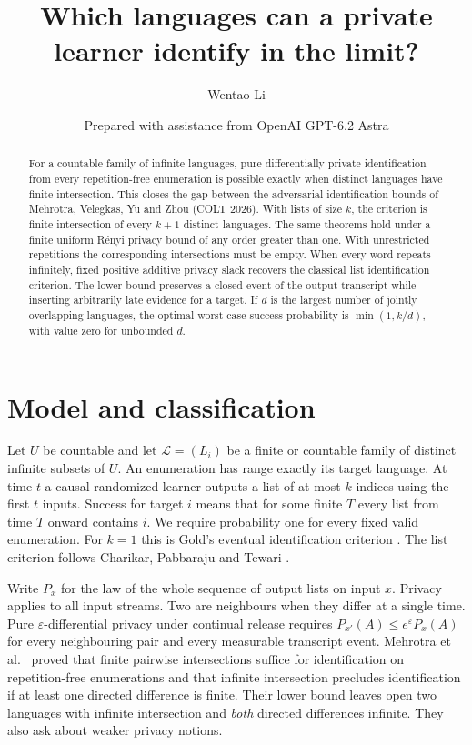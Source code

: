 \documentclass[11pt]{article}
\title{Which languages can a private learner identify in the limit?}
\author{Wentao Li}
\date{\small Prepared with assistance from OpenAI GPT-6.2 Astra}
\begin{document}
\maketitle
\begin{abstract}
For a countable family of infinite languages, pure differentially private identification from every repetition-free enumeration is possible exactly when distinct languages have finite intersection. This closes the gap between the adversarial identification bounds of Mehrotra, Velegkas, Yu and Zhou (COLT 2026). With lists of size $k$, the criterion is finite intersection of every $k+1$ distinct languages. The same theorems hold under a finite uniform R\'enyi privacy bound of any order greater than one. With unrestricted repetitions the corresponding intersections must be empty. When every word repeats infinitely, fixed positive additive privacy slack recovers the classical list identification criterion. The lower bound preserves a closed event of the output transcript while inserting arbitrarily late evidence for a target. If $d$ is the largest number of jointly overlapping languages, the optimal worst-case success probability is $\min(1,k/d)$, with value zero for unbounded $d$.
\end{abstract}

\section{Model and classification}
Let $U$ be countable and let $\mathcal L=(L_i)$ be a finite or countable family of distinct infinite subsets of $U$. An enumeration has range exactly its target language. At time $t$ a causal randomized learner outputs a list of at most $k$ indices using the first $t$ inputs. Success for target $i$ means that for some finite $T$ every list from time $T$ onward contains $i$. We require probability one for every fixed valid enumeration. For $k=1$ this is Gold's eventual identification criterion \cite{gold}. The list criterion follows Charikar, Pabbaraju and Tewari \cite[Def.~5]{cpt}.

Write $P_x$ for the law of the whole sequence of output lists on input $x$. Privacy applies to all input streams. Two are neighbours when they differ at a single time. Pure $\varepsilon$-differential privacy under continual release requires $P_{x'}(A)\le e^\varepsilon P_x(A)$ for every neighbouring pair and every measurable transcript event. Mehrotra et al.\ \cite[Thms.~1.5, C.5]{mv} proved that finite pairwise intersections suffice for identification on repetition-free enumerations and that infinite intersection precludes identification if at least one directed difference is finite. Their lower bound leaves open two languages with infinite intersection and \emph{both} directed differences infinite. They also ask about weaker privacy notions.
\end{document}
